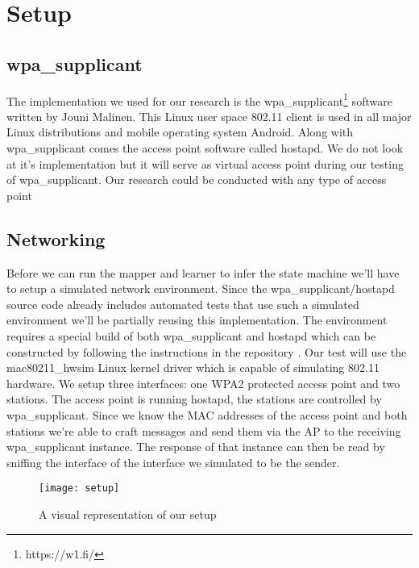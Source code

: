 \section{Setup}

\subsection{wpa\_supplicant}

The implementation we used for our research is the wpa\_supplicant\footnote{https://w1.fi/} software written by Jouni Malinen. This Linux user space 802.11 client is used in all major Linux distributions and mobile operating system Android.
Along with wpa\_supplicant comes the access point software called hostapd. We do not look at it's implementation but it will serve as virtual access point during our testing of wpa\_supplicant. Our research could be conducted with any type of access point

\subsection{Networking}

Before we can run the mapper and learner to infer the state machine we'll have to setup a simulated network environment. Since the wpa\_supplicant/hostapd source code already includes automated tests that use such a simulated environment we'll be partially reusing this implementation.
The environment requires a special build of both wpa\_supplicant and hostapd which can be constructed by following the instructions in the repository \cite{Malinen:2013}.
Our test will use the mac80211\_hwsim Linux kernel driver which is capable of simulating 802.11 hardware. We setup three interfaces: one WPA2 protected access point and two stations. The access point is running hostapd, the stations are controlled by wpa\_supplicant. Since we know the MAC addresses of the access point and both stations we're able to craft messages and send them via the AP to the receiving wpa\_supplicant instance. The response of that instance can then be read by sniffing the interface of the interface we simulated to be the sender.

\begin{figure}[!h]
	\centering
	\texttt{[image: setup]}
	\caption{A visual representation of our setup}
	\label{fig:setup}
\end{figure}
